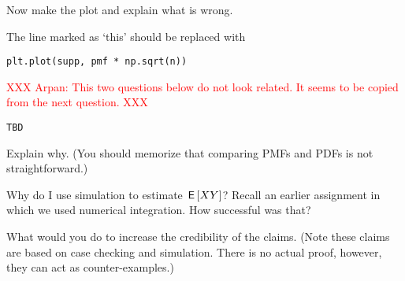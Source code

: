 \begin{exercise}
Now make the plot and  explain what is wrong.
\end{exercise}

\begin{exercise}
The line  marked as `this' should be replaced with
\begin{verbatim}
plt.plot(supp, pmf * np.sqrt(n))
\end{verbatim}

\textcolor{red}{XXX Arpan: This two questions below do not look related. It seems to be copied from the next question. XXX}
\begin{verbatim}
TBD
\end{verbatim}
Explain why.  (You should memorize  that comparing PMFs and PDFs is not straightforward.)
\end{exercise}

\begin{exercise}
Why do I use simulation to estimate $\,\mathsf{E}\left[XY\right]$? Recall an earlier assignment in which we used numerical  integration. How successful was that?
\end{exercise}

\begin{exercise}
What would you do to increase the credibility of the claims. (Note these claims  are based on case checking and simulation. There is no actual proof, however, they can act as counter-examples.)
\end{exercise}


